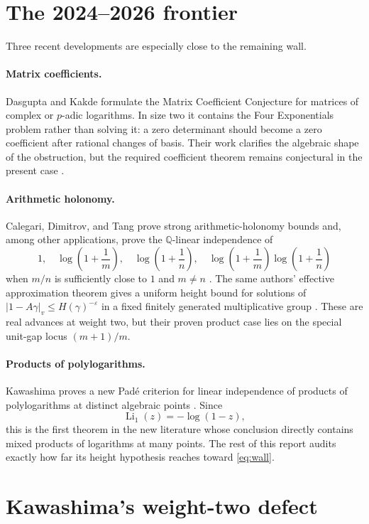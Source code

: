 \documentclass[11pt]{article}
\theoremstyle{definition}
\newcommand{\Q}{\mathbb Q}
\newcommand{\Li}{\operatorname{Li}}
\begin{document}
\section{The 2024--2026 frontier}

Three recent developments are especially close to the remaining wall.

\paragraph{Matrix coefficients.}
Dasgupta and Kakde formulate the Matrix Coefficient Conjecture for matrices of complex or
$p$-adic logarithms.  In size two it contains the Four Exponentials problem rather than
solving it: a zero determinant should become a zero coefficient after rational changes of
basis.  Their work clarifies the algebraic shape of the obstruction, but the required
coefficient theorem remains conjectural in the present case \cite{DasguptaKakde2026}.

\paragraph{Arithmetic holonomy.}
Calegari, Dimitrov, and Tang prove strong arithmetic-holonomy bounds and, among other
applications, prove the $\Q$-linear independence of
\[
  1,\quad \log\!\left(1+\frac1m\right),\quad
  \log\!\left(1+\frac1n\right),\quad
  \log\!\left(1+\frac1m\right)\log\!\left(1+\frac1n\right)
\]
when $m/n$ is sufficiently close to $1$ and $m\ne n$ \cite{CDTProducts}.  The same authors'
effective approximation theorem gives a uniform height bound for solutions of
$|1-A\gamma|_v\le H(\gamma)^{-\varepsilon}$ in a fixed finitely generated multiplicative
group \cite{CDTHolonomy}.  These are real advances at weight two, but their proven product
case lies on the special unit-gap locus $(m+1)/m$.

\paragraph{Products of polylogarithms.}
Kawashima proves a new Pad\'e criterion for linear independence of products of
polylogarithms at distinct algebraic points \cite{Kawashima2026}.  Since
\[
  \Li_1(z)=-\log(1-z),
\]
this is the first theorem in the new literature whose conclusion directly contains mixed
products of logarithms at many points.  The rest of this report audits exactly how far its
height hypothesis reaches toward \eqref{eq:wall}.

\section{Kawashima's weight-two defect}
\end{document}
